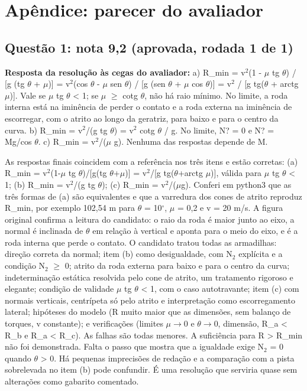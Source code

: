 \documentclass{article}%
\begin{document}
\section*{Apêndice: parecer do avaliador}%
\subsection*{Questão 1: nota 9,2 (aprovada, rodada 1 de 1)}%
\textbf{Resposta da resolução às cegas do avaliador:} a) R\_min = v$^2$(1 - $\mu$ tg $\theta$) / {[}g (tg $\theta$ + $\mu$){]} = v$^2$(cos $\theta$ - $\mu$ sen $\theta$) / {[}g (sen $\theta$ + $\mu$ cos $\theta$){]} = v$^2$ / {[}g tg($\theta$ + arctg $\mu$){]}. Vale se $\mu$ tg $\theta$ < 1; se $\mu$ $\geq$ cotg $\theta$, não há raio mínimo. No limite, a roda interna está na iminência de perder o contato e a roda externa na iminência de escorregar, com o atrito ao longo da geratriz, para baixo e para o centro da curva.\newline%
\newline%
b) R\_min = v$^2$/(g tg $\theta$) = v$^2$ cotg $\theta$ / g. No limite, N? = 0 e N? = Mg/cos $\theta$.\newline%
\newline%
c) R\_min = v$^2$/($\mu$ g).\newline%
\newline%
Nenhuma das respostas depende de M.\par %
As respostas finais coincidem com a referência nos três itens e estão corretas: (a) R\_min = v$^2$(1-$\mu$ tg $\theta$)/{[}g(tg $\theta$+$\mu$){]} = v$^2$/{[}g tg($\theta$+arctg $\mu$){]}, válida para $\mu$ tg $\theta$ < 1; (b) R\_min = v$^2$/(g tg $\theta$); (c) R\_min = v$^2$/($\mu$g). Conferi em python3 que as três formas de (a) são equivalentes e que a varredura dos cones de atrito reproduz R\_min, por exemplo 102,54 m para $\theta$ = 10$^\circ$, $\mu$ = 0,2 e v = 20 m/s. A figura original confirma a leitura do candidato: o raio da roda é maior junto ao eixo, a normal é inclinada de $\theta$ em relação à vertical e aponta para o meio do eixo, e é a roda interna que perde o contato. O candidato tratou todas as armadilhas: direção correta da normal; item (b) como desigualdade, com N$_{2}$ explícita e a condição N$_{2}$ $\geq$ 0; atrito da roda externa para baixo e para o centro da curva; indeterminação estática resolvida pelo cone de atrito, um tratamento rigoroso e elegante; condição de validade $\mu$ tg $\theta$ < 1, com o caso autotravante; item (c) com normais verticais, centrípeta só pelo atrito e interpretação como escorregamento lateral; hipóteses do modelo (R muito maior que as dimensões, sem balanço de torques, v constante); e verificações (limites $\mu$$\to$0 e $\theta$$\to$0, dimensão, R\_a < R\_b e R\_a < R\_c). As falhas são todas menores. A suficiência para R > R\_min não foi demonstrada. Falta o passo que mostra que a igualdade exige N$_{2}$ = 0 quando $\theta$ > 0. Há pequenas imprecisões de redação e a comparação com a pista sobrelevada no item (b) pode confundir. É uma resolução que serviria quase sem alterações como gabarito comentado.%
\end{document}
